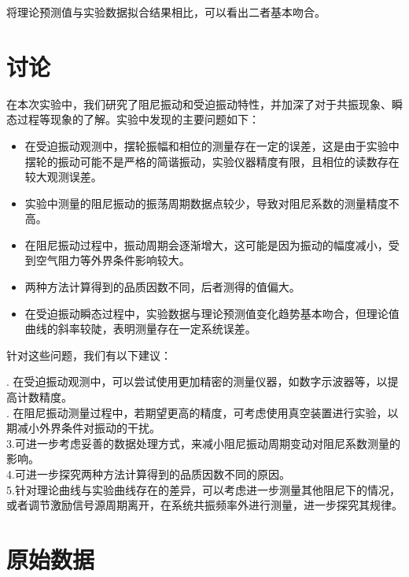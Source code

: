 \documentclass{ctexart}
\begin{document}
\noindent 将理论预测值与实验数据拟合结果相比，可以看出二者基本吻合。

\section{讨论}

在本次实验中，我们研究了阻尼振动和受迫振动特性，并加深了对于共振现象、瞬态过程等现象的了解。实验中发现的主要问题如下：
\begin{itemize}
  \item 在受迫振动观测中，摆轮振幅和相位的测量存在一定的误差，这是由于实验中摆轮的振动可能不是严格的简谐振动，实验仪器精度有限，且相位的读数存在较大观测误差。
  \item 实验中测量的阻尼振动的振荡周期数据点较少，导致对阻尼系数的测量精度不高。
  \item 在阻尼振动过程中，振动周期会逐渐增大，这可能是因为振动的幅度减小，受到空气阻力等外界条件影响较大。
  \item 两种方法计算得到的品质因数不同，后者测得的值偏大。
  \item 在受迫振动瞬态过程中，实验数据与理论预测值变化趋势基本吻合，但理论值曲线的斜率较陡，表明测量存在一定系统误差。
\end{itemize}
针对这些问题，我们有以下建议：

. 在受迫振动观测中，可以尝试使用更加精密的测量仪器，如数字示波器等，以提高计数精度。\\
. 在阻尼振动测量过程中，若期望更高的精度，可考虑使用真空装置进行实验，以期减小外界条件对振动的干扰。\\
\noindent 3.可进一步考虑妥善的数据处理方式，来减小阻尼振动周期变动对阻尼系数测量的影响。\\
\noindent 4.可进一步探究两种方法计算得到的品质因数不同的原因。\\
\noindent 5.针对理论曲线与实验曲线存在的差异，可以考虑进一步测量其他阻尼下的情况，或者调节激励信号源周期离开，在系统共振频率外进行测量，进一步探究其规律。\\

\section{原始数据}
\end{document}
